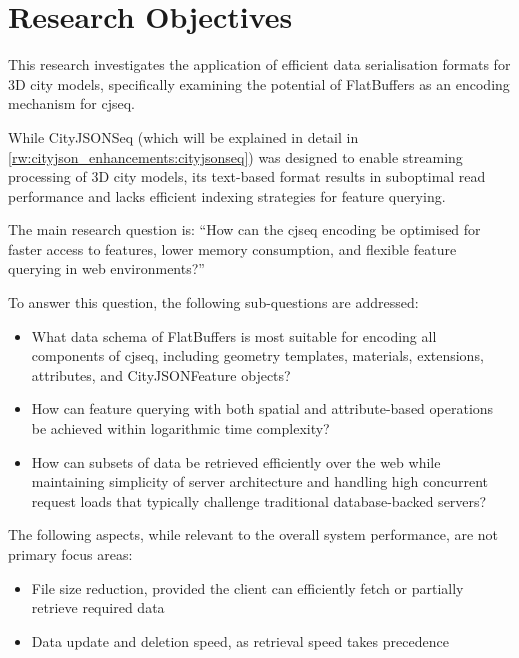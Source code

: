 \section{Research Objectives}
\label{introduction:research_objectives}
This research investigates the application of efficient data serialisation formats for 3D city models, specifically examining the potential of FlatBuffers \citep{flatbuffers} as an encoding mechanism for \ac{cjseq}.

While CityJSONSeq (which will be explained in detail in \autoref{rw:cityjson_enhancements:cityjsonseq}) was designed to enable streaming processing of 3D city models, its text-based format results in suboptimal read performance and lacks efficient indexing strategies for feature querying.

The main research question is:
``How can the \ac{cjseq} encoding be optimised for faster access to features, lower memory consumption, and flexible feature querying in web environments?''

To answer this question, the following sub-questions are addressed:
\begin{itemize}
  \item What data schema of FlatBuffers is most suitable for encoding all components of \ac{cjseq}, including geometry templates, materials, extensions, attributes, and CityJSONFeature objects?
  \item How can feature querying with both spatial and attribute-based operations be achieved within logarithmic time complexity?
  \item How can subsets of data be retrieved efficiently over the web while maintaining simplicity of server architecture and handling high concurrent request loads that typically challenge traditional database-backed servers?
\end{itemize}

The following aspects, while relevant to the overall system performance, are not primary focus areas:
\begin{itemize}
  \item File size reduction, provided the client can efficiently fetch or partially retrieve required data
  \item Data update and deletion speed, as retrieval speed takes precedence
\end{itemize}


